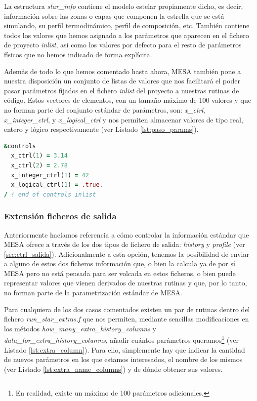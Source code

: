 La estructura \textit{star\_info} contiene el modelo estelar propiamente dicho, es decir, información sobre las zonas o capas que componen la estrella que se está simulando, su perfil termodinámico, perfil de composición, etc. También contiene todos los valores que hemos asignado a los parámetros que aparecen en el fichero de proyecto \textit{inlist}, así como los valores por defecto para el resto de parámetros físicos que no hemos indicado de forma explícita.\par

Además de todo lo que hemos comentado hasta ahora, MESA también pone a nuestra disposición un conjunto de listas de valores que nos facilitará el poder pasar parámetros fijados en el fichero \textit{inlist} del proyecto a nuestras rutinas de código. Estos vectores de elementos, con un tamaño máximo de 100 valores y que no forman parte del conjunto estándar de parámetros, son: \textit{x\_ctrl}, \textit{x\_integer\_ctrl}, y \textit{x\_logical\_ctrl} y nos permiten almacenar valores de tipo real, entero y lógico respectivamente (ver Listado \ref{lst:paso_params}).\par

\begin{lstlisting}[language=Fortran, float, caption={Paso de parámetros no estándar a través del fichero de proyecto inlist}, label={lst:paso_params}]
&controls
  x_ctrl(1) = 3.14
  x_ctrl(2) = 2.78
  x_integer_ctrl(1) = 42
  x_logical_ctrl(1) = .true.
/ ! end of controls inlist
\end{lstlisting}

\subsubsection{Extensión ficheros de salida}
Anteriormente hacíamos referencia a cómo controlar la información estándar que MESA ofrece a través de los dos tipos de fichero de salida: \textit{history} y \textit{profile} (ver \ref{sec:ctrl_salida}). Adicionalmente a esta opción, tenemos la posibilidad de enviar a alguno de estos dos ficheros información que, o bien la calcula ya de por sí MESA pero no está pensada para ser volcada en estos ficheros, o bien puede representar valores que vienen derivados de nuestras rutinas y que, por lo tanto, no forman parte de la parametrización estándar de MESA.\par

Para cualquiera de los dos casos comentados existen un par de rutinas dentro del fichero \textit{run\_star\_extras.f} que nos permiten, mediante sencillas modificaciones en los métodos \textit{how\_many\_extra\_history\_columns} y \textit{data\_for\_extra\_history\_columns}, añadir cuántos parámetros queramos\footnote{En realidad, existe un máximo de 100 parámetros adicionales.} (ver Listado \ref{lst:extra_column}). Para ello, simplemente hay que indicar la cantidad de nuevos parámetros en los que estamos interesados, el nombre de los mismos (ver Listado \ref{lst:extra_name_columns}) y de dónde obtener sus valores.\par

